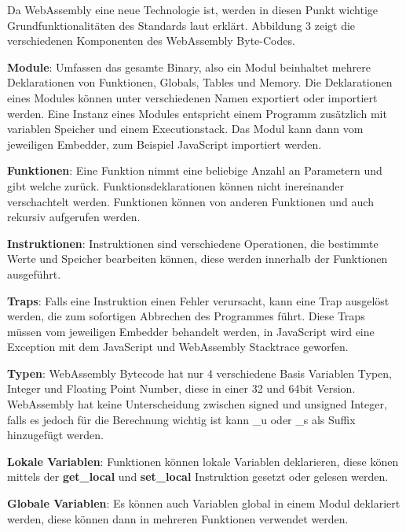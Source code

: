 Da WebAssembly eine neue Technologie ist, werden in diesen Punkt wichtige Grundfunktionalitäten des Standards laut \autocite[p.~186--189]{Haas2017} erklärt. Abbildung 3 zeigt die verschiedenen Komponenten des WebAssembly Byte-Codes.

\begin{flushleft}
\textbf{Module}: Umfassen das gesamte Binary, also ein Modul beinhaltet mehrere Deklarationen von Funktionen, Globals, Tables und Memory. Die Deklarationen eines Modules können unter verschiedenen Namen exportiert oder importiert werden. Eine Instanz eines Modules entspricht einem Programm zusätzlich mit variablen Speicher und einem Executionstack. Das Modul kann dann vom jeweiligen Embedder, zum Beispiel JavaScript importiert werden.

\hfill \break

\textbf{Funktionen}: Eine Funktion nimmt eine beliebige Anzahl an Parametern und gibt welche zurück. Funktionsdeklarationen können nicht inereinander verschachtelt werden. Funktionen können von anderen Funktionen und auch rekursiv aufgerufen werden.

\hfill \break

\textbf{Instruktionen}: Instruktionen sind verschiedene Operationen, die bestimmte Werte und Speicher bearbeiten können, diese werden innerhalb der Funktionen ausgeführt.

\hfill \break

\textbf{Traps}: Falls eine Instruktion einen Fehler verursacht, kann eine Trap ausgelöst werden, die zum sofortigen Abbrechen des Programmes führt. Diese Traps müssen vom jeweiligen Embedder behandelt werden, in JavaScript wird eine Exception mit dem JavaScript und WebAssembly Stacktrace geworfen.

\hfill \break

\textbf{Typen}: WebAssembly Bytecode hat nur 4 verschiedene Basis Variablen Typen, Integer und Floating Point Number, diese in einer 32 und 64bit Version. WebAssembly hat keine Unterscheidung zwischen signed und unsigned Integer, falls es jedoch für die Berechnung wichtig ist kann \_u oder \_s als Suffix hinzugefügt werden.

\hfill \break

\textbf{Lokale Variablen}: Funktionen können lokale Variablen deklarieren, diese könen mittels der \textbf{get\_local} und \textbf{set\_local} Instruktion gesetzt oder gelesen werden.

\hfill \break

\textbf{Globale Variablen}: Es können auch Variablen global in einem Modul deklariert werden, diese können dann in mehreren Funktionen verwendet werden.


\end{flushleft}
